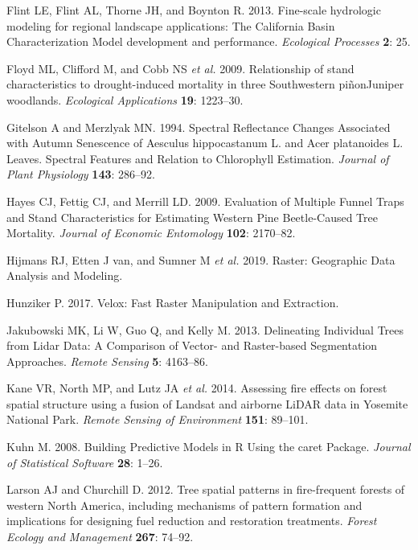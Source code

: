 \documentclass[]{article}
\begin{document}
\hypertarget{ref-flint2013}{}
Flint LE, Flint AL, Thorne JH, and Boynton R. 2013. Fine-scale
hydrologic modeling for regional landscape applications: The California
Basin Characterization Model development and performance.
\emph{Ecological Processes} \textbf{2}: 25.

\hypertarget{ref-floyd2009}{}
Floyd ML, Clifford M, and Cobb NS \emph{et al.} 2009. Relationship of
stand characteristics to drought-induced mortality in three Southwestern
piñonJuniper woodlands. \emph{Ecological Applications} \textbf{19}:
1223--30.

\hypertarget{ref-gitelson1994}{}
Gitelson A and Merzlyak MN. 1994. Spectral Reflectance Changes
Associated with Autumn Senescence of Aesculus hippocastanum L. and Acer
platanoides L. Leaves. Spectral Features and Relation to Chlorophyll
Estimation. \emph{Journal of Plant Physiology} \textbf{143}: 286--92.

\hypertarget{ref-hayes2009}{}
Hayes CJ, Fettig CJ, and Merrill LD. 2009. Evaluation of Multiple Funnel
Traps and Stand Characteristics for Estimating Western Pine
Beetle-Caused Tree Mortality. \emph{Journal of Economic Entomology}
\textbf{102}: 2170--82.

\hypertarget{ref-hijmans2019}{}
Hijmans RJ, Etten J van, and Sumner M \emph{et al.} 2019. Raster:
Geographic Data Analysis and Modeling.

\hypertarget{ref-hunziker2017}{}
Hunziker P. 2017. Velox: Fast Raster Manipulation and Extraction.

\hypertarget{ref-jakubowski2013}{}
Jakubowski MK, Li W, Guo Q, and Kelly M. 2013. Delineating Individual
Trees from Lidar Data: A Comparison of Vector- and Raster-based
Segmentation Approaches. \emph{Remote Sensing} \textbf{5}: 4163--86.

\hypertarget{ref-kane2014}{}
Kane VR, North MP, and Lutz JA \emph{et al.} 2014. Assessing fire
effects on forest spatial structure using a fusion of Landsat and
airborne LiDAR data in Yosemite National Park. \emph{Remote Sensing of
Environment} \textbf{151}: 89--101.

\hypertarget{ref-kuhn2008}{}
Kuhn M. 2008. Building Predictive Models in R Using the caret Package.
\emph{Journal of Statistical Software} \textbf{28}: 1--26.

\hypertarget{ref-larson2012}{}
Larson AJ and Churchill D. 2012. Tree spatial patterns in fire-frequent
forests of western North America, including mechanisms of pattern
formation and implications for designing fuel reduction and restoration
treatments. \emph{Forest Ecology and Management} \textbf{267}: 74--92.
\end{document}

